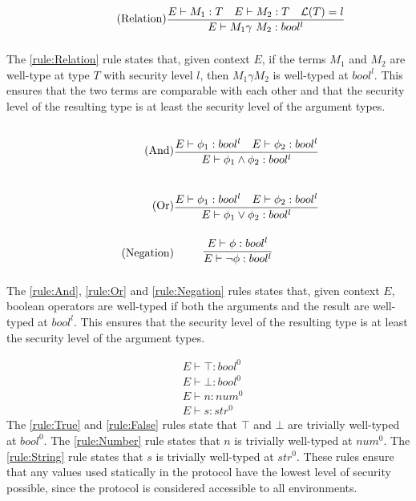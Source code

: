 \begin{align*}
    \tag{Relation}\label{rule:Relation} &\infrule{E\vdash M_1:T\quad E\vdash M_2:T\quad\level{T}=l}{E\vdash M_1 \gamma\ M_2:bool^{l}}
\end{align*}
The \ref{rule:Relation} rule states that, given context $E$, if the terms $M_1$ and $M_2$ are well-type at type $T$ with security level $l$, then $M_1\gamma M_2$ is well-typed at $bool^l$. This ensures that the two terms are comparable with each other and that the security level of the resulting type is at least the security level of the argument types.

\begin{align*}
    \tag{And}\label{rule:And} &\infrule{E\vdash \phi_1:bool^l\quad E\vdash \phi_2:bool^l}{E\vdash \phi _1 \land \phi _2:bool^{l}}\\
    \tag{Or}\label{rule:Or} &\infrule{E\vdash \phi_1:bool^l\quad E\vdash \phi_2:bool^l}{E\vdash \phi _1 \lor \phi _2:bool^{l}}\\
    \tag{Negation}\label{rule:Negation} &\infrule{E\vdash \phi :bool^l }{E\vdash \neg \phi :bool^l}
\end{align*}

The \ref{rule:And}, \ref{rule:Or} and \ref{rule:Negation} rules states that, given context $E$, boolean operators are well-typed if both the arguments and the result are well-typed at $bool^l$. This ensures that the security level of the resulting type is at least the security level of the argument types.

\begin{align*}
    \tag{True}\label{rule:True} &E\vdash\top:bool^0\\
    \tag{False}\label{rule:False} &E\vdash\bot:bool^0\\
    \tag{Number}\label{rule:Number} &E\vdash n:{num^0}\\
    \tag{String}\label{rule:String} &E\vdash s:{str^0}
\end{align*}
The \ref{rule:True} and \ref{rule:False} rules state that $\top$ and $\bot$ are trivially well-typed at $bool^0$.
The \ref{rule:Number} rule states that $n$ is trivially well-typed at $num^0$.
The \ref{rule:String} rule states that $s$ is trivially well-typed at $str^0$.
These rules ensure that any values used statically in the protocol have the lowest level of security possible, since the protocol is considered accessible to all environments.

\FloatBarrier
